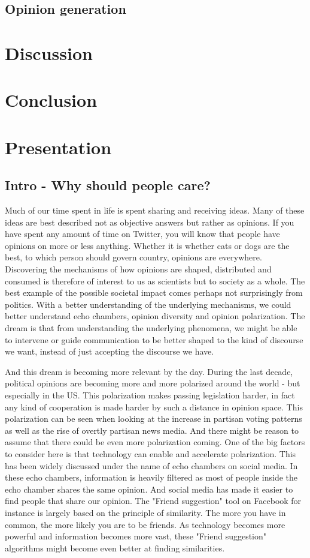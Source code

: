 \documentclass[9pt,twocolumn,twoside]{ilcss}
\begin{document}
\subsection{Opinion generation}

\section{Discussion}

\section{Conclusion}

\section{Presentation}
\subsection{Intro - Why should people care?}
Much of our time spent in life is spent sharing and receiving ideas. 
Many of these ideas are best described not as objective answers but rather as opinions.
If you have spent any amount of time on Twitter,
you will know that people have opinions on more or less anything. 
Whether it is whether cats or dogs are the best, to which person should govern country, opinions are everywhere.
Discovering the mechanisms of how opinions are shaped, distributed and consumed is therefore of interest to us as scientists but to society as a whole.
The best example of the possible societal impact comes perhaps not surprisingly from politics. With a better understanding of the underlying mechanisms, we could better understand echo chambers, opinion diversity and opinion polarization. 
The dream is that from understanding the underlying phenomena, we might be able to intervene or guide communication to be better shaped to the kind of discourse we want, instead of just accepting the discourse we have.

And this dream is becoming more relevant by the day.
During the last decade, political opinions are becoming more and more polarized around the world - but especially in the US. 
This polarization makes passing legislation harder, in fact any kind of cooperation is made harder by such a distance in opinion space. 
This polarization can be seen when looking at the increase in partisan voting patterns as well as the rise of overtly partisan news media. 
And there might be reason to assume that there could be even more polarization coming. 
One of the big factors to consider here is that technology can enable and accelerate polarization. 
This has been widely discussed under the name of echo chambers on social media. 
In these echo chambers, information is heavily filtered as most of people inside the echo chamber shares the same opinion.
And social media has made it easier to find people that share our opinion. The "Friend suggestion" tool on Facebook for instance is largely based on the principle of similarity. 
The more you have in common, the more likely you are to be friends.
As technology becomes more powerful and information becomes more vast, these "Friend suggestion" algorithms might become even better at finding similarities.
\end{document}
